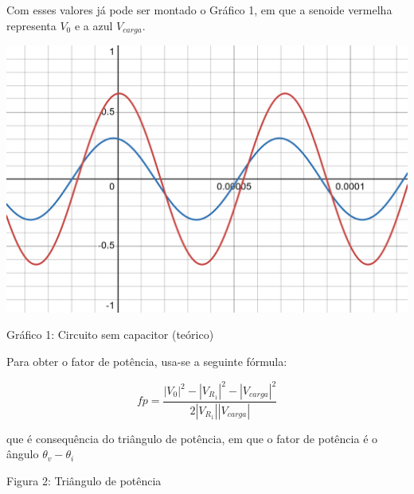 \documentclass[a4 paper]{article}
\begin{document}
Com esses valores já pode ser montado o Gráfico 1, em que a senoide vermelha representa $V_0$ e a azul $V_{carga}$.

\vspace{3cm}
\begin{table}[h]
\centering
\includegraphics[scale=0.25]{rgadicoas/grafico1}
\end{table}

\begin{center}
Gráfico 1: Circuito sem capacitor (teórico)
\end{center}

\newpage


Para obter o fator de potência, usa-se a seguinte fórmula:

\[fp = \frac{|V_0|^2-|V_{R_1}|^2-|V_{carga}|^2}{2|V_{R_1}||V_{carga}|}\]

que é consequência do triângulo de potência, em que o fator de potência é o ângulo $\theta_v-\theta_i$


\vspace{2cm}
\begin{center}
\end{center}

\begin{center}
Figura 2: Triângulo de potência
\end{center}
\vspace{2cm}
\end{document}
